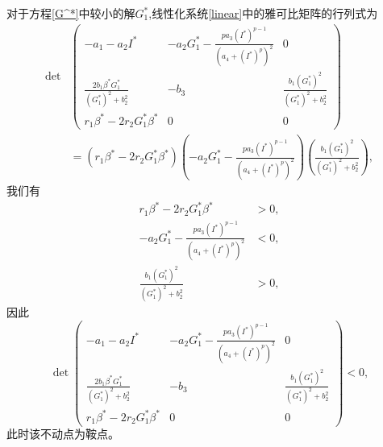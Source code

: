 对于方程\ref{G^*}中较小的解$G_1^*$,线性化系统\ref{linear}中的雅可比矩阵的行列式为
\begin{equation}
    \begin{aligned}
        \det&\begin{pmatrix}
            -a_1-a_2I^*                                & -a_2G_1^*-\frac{pa_3(I^*)^{p-1}}{(a_4+(I^*)^p)^2} & 0                                      \\
            \frac{2b_1\beta^*G_1^*}{(G_1^*)^2 + b_2^2} & -b_3                                              & \frac{b_1(G_1^*)^2}{(G_1^*)^2 + b_2^2} \\
            r_1\beta^*-2r_2G_1^*\beta^*                & 0                                                 & 0
        \end{pmatrix}\\
        &=(r_1\beta^*-2r_2G_1^*\beta^*)(-a_2G_1^*-\frac{pa_3(I^*)^{p-1}}{(a_4+(I^*)^p)^2})( \frac{b_1(G_1^*)^2}{(G_1^*)^2 + b_2^2}),
    \end{aligned}
\end{equation}
我们有
\begin{equation}
    \begin{aligned}
        r_1\beta^*-2r_2G_1^*\beta^*                       & >0, \\
        -a_2G_1^*-\frac{pa_3(I^*)^{p-1}}{(a_4+(I^*)^p)^2} & <0, \\
        \frac{b_1(G_1^*)^2}{(G_1^*)^2 + b_2^2}            & >0,
    \end{aligned}
\end{equation}
因此\begin{equation}
    \det\begin{pmatrix}
        -a_1-a_2I^*                                & -a_2G_1^*-\frac{pa_3(I^*)^{p-1}}{(a_4+(I^*)^p)^2} & 0                                     \\
        \frac{2b_1\beta^*G_1^*}{(G_1^*)^2 + b_2^2} & -b_3                                              & \frac{b_1(G_1^*)^2}{(G_1^*)^2 + b_2^2} \\
        r_1\beta^*-2r_2G_1^*\beta^*                & 0                                                 & 0
    \end{pmatrix}<0,
\end{equation}
此时该不动点为鞍点。

